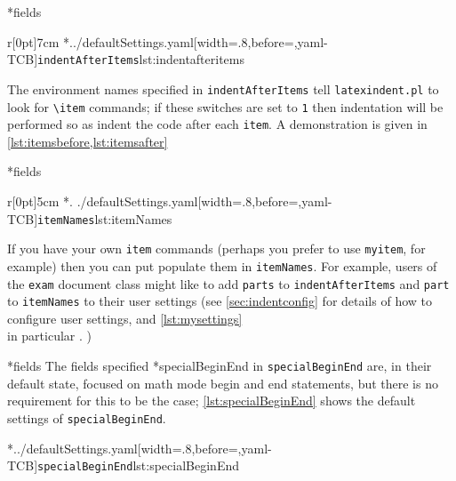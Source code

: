 *{fields}
	\begin{wrapfigure}[5]{r}[0pt]{7cm}
		\cmhlistingsfromfile[style=indentAfterItems]*{../defaultSettings.yaml}[width=.8\linewidth,before=\centering,yaml-TCB]{\texttt{indentAfterItems}}{lst:indentafteritems}
	\end{wrapfigure}
	The environment names specified in \texttt{indentAfterItems}  tell \texttt{latexindent.pl} to look for \lstinline!\item! commands; if these switches are set to \texttt{1} then indentation will be performed so as indent the code after each \texttt{item}.
	A demonstration is given in \cref{lst:itemsbefore,lst:itemsafter} 

	\begin{minipage}{.45\textwidth}
	\end{minipage} \hfill
	\begin{minipage}{.45\textwidth}
	\end{minipage} 

*{fields} \begin{wrapfigure}[5]{r}[0pt]{5cm} \cmhlistingsfromfile[style=itemNames]*{.
		./defaultSettings.yaml}[width=.8\linewidth,before=\centering,yaml-TCB]{\texttt{itemNames}}{lst:itemNames}%
	\end{wrapfigure}
	If you have your own \texttt{item} commands (perhaps you prefer to use \texttt{myitem}, for example) then you can put populate them in \texttt{itemNames}.
	For example, users of the \texttt{exam} document class might like to add \texttt{parts} to \texttt{indentAfterItems} and \texttt{part} to \texttt{itemNames} to their user settings (see \vref{sec:indentconfig} for details of how to configure user settings, and \vref{lst:mysettings} \\ in particular \label{page:examsettings}.
	)

*{fields}\label{yaml:specialBeginEnd}
	The fields specified%
	*{specialBeginEnd} in \texttt{specialBeginEnd} are, in their default state, focused on math mode begin and end statements, but there is no requirement for this to be the case; \cref{lst:specialBeginEnd} shows the default settings of \texttt{specialBeginEnd}.

	\cmhlistingsfromfile[style=specialBeginEnd]*{../defaultSettings.yaml}[width=.8\linewidth,before=\centering,yaml-TCB]{\texttt{specialBeginEnd}}{lst:specialBeginEnd}

